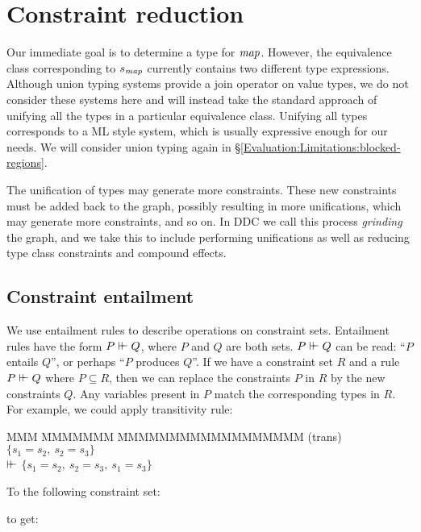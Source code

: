 \pagebreak{}
\section{Constraint reduction}
\label{Inference:Reduction}

Our immediate goal is to determine a type for $\operatorname{\mathit{map}}$. However, the equivalence class corresponding to $s_{\operatorname{\mathit{map}}}$ currently contains two different type expressions. Although union typing systems \cite{dunfield:intersections-and-unions} provide a join operator on value types, we do not consider these systems here and will instead take the standard approach of unifying all the types in a particular equivalence class. Unifying all types corresponds to a ML style system, which is usually expressive enough for our needs. We will consider union typing again in \S\ref{Evaluation:Limitations:blocked-regions}.

The unification of types may generate more constraints. These new constraints must be added back to the graph, possibly resulting in more unifications, which may generate more constraints, and so on. In DDC we call this process \emph{grinding} the graph, and we take this to include performing unifications as well as reducing type class constraints and compound effects. 

\subsection{Constraint entailment}
We use entailment rules to describe operations on constraint sets. Entailment rules have the form $P \vdash\mkern-6mu\vdash Q$, where $P$ and $Q$ are both sets. $P \vdash\mkern-6mu\vdash Q$ can be read: ``$P$ entails $Q$'', or perhaps ``$P$ produces $Q$''. If we have a constraint set $R$ and a rule $P \vdash\mkern-6mu\vdash Q$ where $P \subseteq R$, then we can replace the constraints $P$ in $R$ by the new constraints $Q$. Any variables present in $P$ match the corresponding types in $R$. For example, we could apply transitivity rule:

\begin{tabbing}
MMM \= MMMMMMM \= MMMMMMMMMMMMMMMMMM \kill
	\> (trans)	 \> $\{s_1 = s_2, \ s_2 = s_3 \}$ \\
	\> \qq $\vdash\mkern-6mu\vdash$ \> $\{ s_1 = s_2, \ s_2 = s_3, \ s_1 = s_3 \}$
\end{tabbing}

To the following constraint set:


to get:

